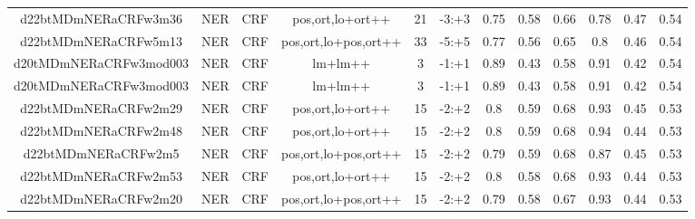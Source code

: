 \documentclass[a4paper]{article}
\begin{document}
\begin{landscape}
\begin{center}
\begin{tabular}{ |c|c|c|c|c|c|c|c|c|c|c|c|}
 
 	
 	\small{ d22btMDmNERaCRFw3m36 } & \small{ NER} & \small{  CRF }  & pos,ort,lo+ort++  &  21 &  \small{  -3:+3 }  &  0.75 & 0.58 & 0.66  &  0.78 & 0.47 & 0.54 \\
 	

 
 	
 	\small{ d22btMDmNERaCRFw5m13 } & \small{ NER} & \small{  CRF }  & pos,ort,lo+pos,ort++  &  33 &  \small{  -5:+5 }  &  0.77 & 0.56 & 0.65  &  0.8 & 0.46 & 0.54 \\
 	

 
 	
 	\small{ d20tMDmNERaCRFw3mod003 } & \small{ NER} & \small{  CRF }  & lm+lm++  &  3 &  \small{  -1:+1 }  &  0.89 & 0.43 & 0.58  &  0.91 & 0.42 & 0.54 \\
 	

 
 	
 	\small{ d20tMDmNERaCRFw3mod003 } & \small{ NER} & \small{  CRF }  & lm+lm++  &  3 &  \small{  -1:+1 }  &  0.89 & 0.43 & 0.58  &  0.91 & 0.42 & 0.54 \\
 	

 
 	
 	\small{ d22btMDmNERaCRFw2m29 } & \small{ NER} & \small{  CRF }  & pos,ort,lo+ort++  &  15 &  \small{  -2:+2 }  &  0.8 & 0.59 & 0.68  &  0.93 & 0.45 & 0.53 \\
 	

 
 	
 	\small{ d22btMDmNERaCRFw2m48 } & \small{ NER} & \small{  CRF }  & pos,ort,lo+ort++  &  15 &  \small{  -2:+2 }  &  0.8 & 0.59 & 0.68  &  0.94 & 0.44 & 0.53 \\
 	

 
 	
 	\small{ d22btMDmNERaCRFw2m5 } & \small{ NER} & \small{  CRF }  & pos,ort,lo+pos,ort++  &  15 &  \small{  -2:+2 }  &  0.79 & 0.59 & 0.68  &  0.87 & 0.45 & 0.53 \\
 	

 
 	
 	\small{ d22btMDmNERaCRFw2m53 } & \small{ NER} & \small{  CRF }  & pos,ort,lo+ort++  &  15 &  \small{  -2:+2 }  &  0.8 & 0.58 & 0.68  &  0.93 & 0.44 & 0.53 \\
 	

 
 	
 	\small{ d22btMDmNERaCRFw2m20 } & \small{ NER} & \small{  CRF }  & pos,ort,lo+pos,ort++  &  15 &  \small{  -2:+2 }  &  0.79 & 0.58 & 0.67  &  0.93 & 0.44 & 0.53 \\
 	


\end{tabular}
\end{center}
\end{landscape}
\end{document}
